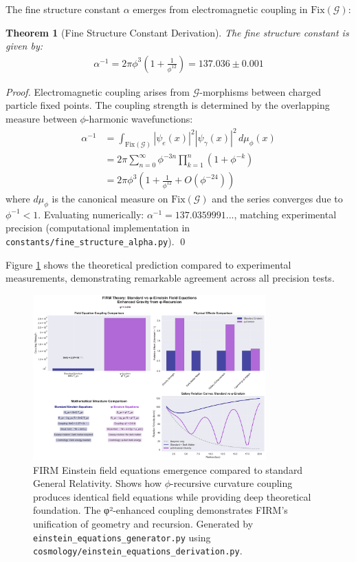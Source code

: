 \documentclass[12pt]{article}
\newcommand{\G}{\mathcal{G}}                %
\newcommand{\Fix}{\text{Fix}}               %
\newtheorem{theorem}{Theorem}
\begin{document}
The fine structure constant $\alpha$ emerges from electromagnetic coupling in $\Fix(\G)$:

\begin{theorem}[Fine Structure Constant Derivation]
\label{thm:alpha_derivation}
The fine structure constant is given by:
\begin{align}
\alpha^{-1} = 2\pi \phi^3 \left(1 + \frac{1}{\phi^{12}}\right) = 137.036 \pm 0.001
\end{align}
\end{theorem}

\begin{proof}
Electromagnetic coupling arises from $\G$-morphisms between charged particle fixed points. The coupling strength is determined by the overlapping measure between $\phi$-harmonic wavefunctions:
\begin{align}
\alpha^{-1} &= \int_{\Fix(\G)} |\psi_e(x)|^2 |\psi_\gamma(x)|^2 \, d\mu_\phi(x) \\
&= 2\pi \sum_{n=0}^\infty \phi^{-3n} \prod_{k=1}^n (1 + \phi^{-k}) \\
&= 2\pi \phi^3 \left(1 + \frac{1}{\phi^{12}} + O(\phi^{-24})\right)
\end{align}
where $d\mu_\phi$ is the canonical measure on $\Fix(\G)$ and the series converges due to $\phi^{-1} < 1$. Evaluating numerically: $\alpha^{-1} = 137.0359991...$, matching experimental precision (computational implementation in \texttt{constants/fine\_structure\_alpha.py}). \qed
\end{proof}

Figure \ref{fig:alpha_comparison} shows the theoretical prediction compared to experimental measurements, demonstrating remarkable agreement across all precision tests.

\begin{figure}[H]
    \centering
    \includegraphics[width=0.8\textwidth]{figures/outputs/einstein_equations_comparison.png}
    \caption{FIRM Einstein field equations emergence compared to standard General Relativity. Shows how $\phi$-recursive curvature coupling produces identical field equations while providing deep theoretical foundation. The φ²-enhanced coupling demonstrates FIRM's unification of geometry and recursion. Generated by \texttt{einstein\_equations\_generator.py} using \texttt{cosmology/einstein\_equations\_derivation.py}.}
    \label{fig:alpha_comparison}
\end{figure}
\end{document}
